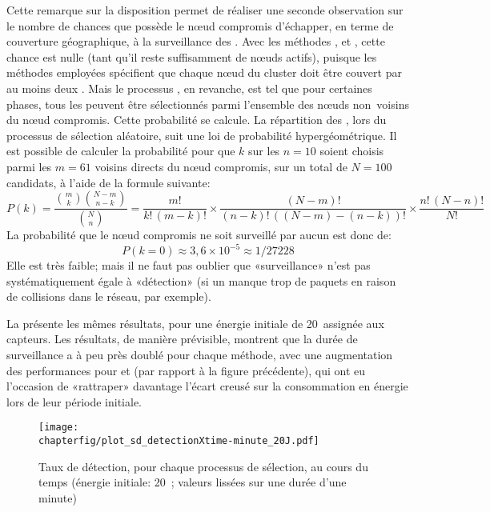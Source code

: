 Cette remarque sur la disposition permet de réaliser une seconde observation sur le nombre de chances que possède le nœud compromis d'échapper, en terme de couverture géographique, à la surveillance des \cns.
Avec les méthodes \ideres, \iddemx et \iddems, cette chance est nulle (tant qu'il reste suffisamment de nœuds actifs), puisque les méthodes employées spécifient que chaque nœud du cluster doit être couvert par au moins deux \cns.
Mais le processus \idrand, en revanche, est tel que pour certaines phases, tous les \cns peuvent être sélectionnés parmi l'ensemble des nœuds non~voisins du nœud compromis.
Cette probabilité se calcule.
La répartition des \cns, lors du processus de sélection aléatoire, suit une loi de probabilité hypergéométrique.
Il est possible de calculer la probabilité pour que $k$ \cns sur les $n=10$ soient choisis parmi les $m=61$ voisins directs du nœud compromis, sur un total de $N=100$ candidats, à l'aide de la formule suivante:
$$P(k) = \frac{{m\choose k}{N-m\choose n-k}}{{N\choose n}}=
\frac{m!}{k!\,(m-k)!}\times\frac{(N-m)!}{(n-k)!\,((N-m)-(n-k))!}\times\frac{n!\,(N-n)!}{N!}$$
La probabilité que le nœud compromis ne soit surveillé par aucun \cn est donc de:
$$P(k=0)\approx3,6\times10^{-5}\approx1/27228$$
Elle est très faible; mais il ne faut pas oublier que «surveillance» n'est pas systématiquement égale à «détection» (si un \cn manque trop de paquets en raison de collisions dans le réseau, par exemple).

La  présente les mêmes résultats, pour une énergie initiale de 20~\joule assignée aux capteurs.
Les résultats, de manière prévisible, montrent que la durée de surveillance a à peu près doublé pour chaque méthode, avec une augmentation des performances pour \iddemx et \iddems (par rapport à la figure précédente), qui ont eu l'occasion de «rattraper» davantage l'écart creusé sur la consommation en énergie lors de leur période initiale.
\begin{figure}[!b]
    \centering
    \texttt{[image: \\chapterfig/plot\_sd\_detectionXtime-minute\_20J.pdf]}
    \caption{Taux de détection, pour chaque processus de sélection, au cours du temps (énergie initiale: 20~\joule; valeurs lissées sur une durée d'une minute)}\label{sd:fig:detec-min-20J}
\end{figure}
